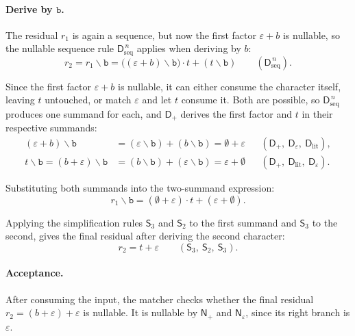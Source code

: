 %

\paragraph{Derive by $\mathtt{b}$.}
The residual $r_1$ is again a sequence,
but now the first factor $\varepsilon + b$ is nullable, 
so the nullable sequence rule $\mathsf{D}_{\mathrm{seq}}^{\,n}$ applies 
when deriving by $b$:
\[
r_2 = r_1 \backslash \mathtt{b}
  = \big((\varepsilon + b) \backslash \mathtt{b}\big) \cdot t
    + (t \backslash \mathtt{b})
  \qquad (\mathsf{D}_{\mathrm{seq}}^{\,n}).
\]

Since the first factor $\varepsilon + b$ is nullable, 
it can either consume the character itself, 
leaving $t$ untouched, or match $\varepsilon$ and let $t$ consume it. 
Both are possible, so $\mathsf{D}_{\mathrm{seq}}^{\,n}$ 
produces one summand for each, 
and $\mathsf{D}_{+}$ derives the first factor 
and $t$ in their respective summands:
\[
\begin{aligned}
(\varepsilon + b) \backslash \mathtt{b}
  &= (\varepsilon \backslash \mathtt{b}) + (b \backslash \mathtt{b})
   = \emptyset + \varepsilon
  &&(\mathsf{D}_{+},\ \mathsf{D}_{\varepsilon},\
           \mathsf{D}_{\mathrm{lit}}), \\[4pt]
t \backslash \mathtt{b} = (b + \varepsilon) \backslash \mathtt{b}
  &= (b \backslash \mathtt{b}) + (\varepsilon \backslash \mathtt{b})
   = \varepsilon + \emptyset
  &&(\mathsf{D}_{+},\ \mathsf{D}_{\mathrm{lit}},\
           \mathsf{D}_{\varepsilon}).
\end{aligned}
\]

Substituting both summands into the two-summand expression:
\[
r_1 \backslash \mathtt{b}
  = (\emptyset + \varepsilon) \cdot t
    + (\varepsilon + \emptyset).
\]

Applying the simplification rules $\mathsf{S}_{3}$ 
and $\mathsf{S}_{2}$ to the first summand and $\mathsf{S}_{3}$ to the second, 
gives the final residual after deriving the second character:
\[
r_2 
  = t + \varepsilon
  \qquad (\mathsf{S}_{3},\ \mathsf{S}_{2},\ \mathsf{S}_{3}).
\]

\paragraph{Acceptance.}
After consuming the input, 
the matcher checks whether the final
residual $r_2 = (b + \varepsilon) + \varepsilon$ is nullable.
It is nullable by $\mathsf{N}_{+}$ and $\mathsf{N}_{\varepsilon}$,
since its right branch is $\varepsilon$.

